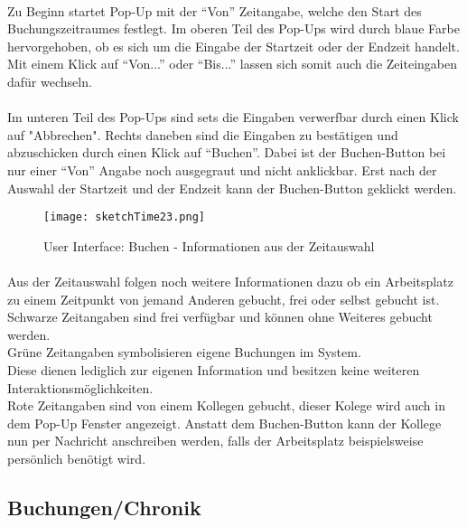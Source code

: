 \paragraph{} Zu Beginn startet Pop-Up mit der "`Von"' Zeitangabe, welche den Start des Buchungszeitraumes festlegt. 
Im oberen Teil des Pop-Ups wird durch blaue Farbe hervorgehoben, ob es sich um die Eingabe der Startzeit oder der Endzeit handelt.
Mit einem Klick auf "`Von..."' oder "`Bis..."' lassen sich somit auch die Zeiteingaben dafür wechseln. 

\paragraph{}Im unteren Teil des Pop-Ups sind sets die Eingaben verwerfbar durch einen Klick auf "Abbrechen".
Rechts daneben sind die Eingaben zu bestätigen und abzuschicken durch einen Klick auf "`Buchen"'.
Dabei ist der Buchen-Button bei nur einer "`Von"' Angabe noch ausgegraut und nicht anklickbar.
Erst nach der Auswahl der Startzeit und der Endzeit kann der Buchen-Button geklickt werden.

\begin{figure}[!h]
  \centering
  \texttt{[image: sketchTime23.png]}
  \caption{User Interface: Buchen - Informationen aus der Zeitauswahl}
  \label{fig:sketch_time_23}
\end{figure}

\paragraph{}Aus der Zeitauswahl folgen noch weitere Informationen dazu ob ein Arbeitsplatz zu einem Zeitpunkt von jemand Anderen gebucht, frei oder selbst gebucht ist. \\
Schwarze Zeitangaben sind frei verfügbar und können ohne Weiteres gebucht werden. \\
Grüne Zeitangaben symbolisieren eigene Buchungen im System. \\
Diese dienen lediglich zur eigenen Information und besitzen keine weiteren Interaktionsmöglichkeiten.\\
Rote Zeitangaben sind von einem Kollegen gebucht, dieser Kolege wird auch in dem Pop-Up Fenster angezeigt.
Anstatt dem Buchen-Button kann der Kollege nun per Nachricht anschreiben werden, falls der Arbeitsplatz beispielsweise persönlich benötigt wird. 

\subsection{Buchungen/Chronik}


